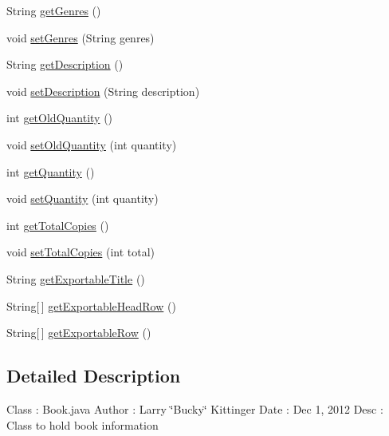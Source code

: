 \begin{DoxyCompactItemize}
String \hyperlink{classw3se_1_1_model_1_1_base_1_1_book_a7624a804599067228ecceb727c97a0c1}{get\-Genres} ()
\item 
void \hyperlink{classw3se_1_1_model_1_1_base_1_1_book_af9d0713c451b9454edfdc4897f77d4ef}{set\-Genres} (String genres)
\item 
String \hyperlink{classw3se_1_1_model_1_1_base_1_1_book_a8a7b47d70a6bfee2c8aaa79e024aaadc}{get\-Description} ()
\item 
void \hyperlink{classw3se_1_1_model_1_1_base_1_1_book_a6f5bf1f664a982c22083ce57b421cbd5}{set\-Description} (String description)
\item 
int \hyperlink{classw3se_1_1_model_1_1_base_1_1_book_ab404c600d504dddbb39fa9f9688636cb}{get\-Old\-Quantity} ()
\item 
void \hyperlink{classw3se_1_1_model_1_1_base_1_1_book_a2a3efba74c0a09eca82acf5e3e4e76f7}{set\-Old\-Quantity} (int quantity)
\item 
int \hyperlink{classw3se_1_1_model_1_1_base_1_1_book_ab11dd1a1d2c43702d488ca91e7b980ca}{get\-Quantity} ()
\item 
void \hyperlink{classw3se_1_1_model_1_1_base_1_1_book_a2693704a56811bc654cbbf257c844caf}{set\-Quantity} (int quantity)
\item 
int \hyperlink{classw3se_1_1_model_1_1_base_1_1_book_a3d81ea34fa0956b57d1377e890a8904c}{get\-Total\-Copies} ()
\item 
void \hyperlink{classw3se_1_1_model_1_1_base_1_1_book_ac5eab42bf1e4fe153dbc4e1378cac0ae}{set\-Total\-Copies} (int total)
\item 
String \hyperlink{classw3se_1_1_model_1_1_base_1_1_book_a47ac5319d1798527cd67f39370832d52}{get\-Exportable\-Title} ()
\item 
String\mbox{[}$\,$\mbox{]} \hyperlink{classw3se_1_1_model_1_1_base_1_1_book_a248db63c39312ae51bd55be728827788}{get\-Exportable\-Head\-Row} ()
\item 
String\mbox{[}$\,$\mbox{]} \hyperlink{classw3se_1_1_model_1_1_base_1_1_book_af0da3cdd8027d4c607191d611381e723}{get\-Exportable\-Row} ()
\end{DoxyCompactItemize}


\subsection{Detailed Description}
Class \-: Book.\-java Author \-: Larry \char`\"{}\-Bucky\char`\"{} Kittinger Date \-: Dec 1, 2012 Desc \-: Class to hold book information 

